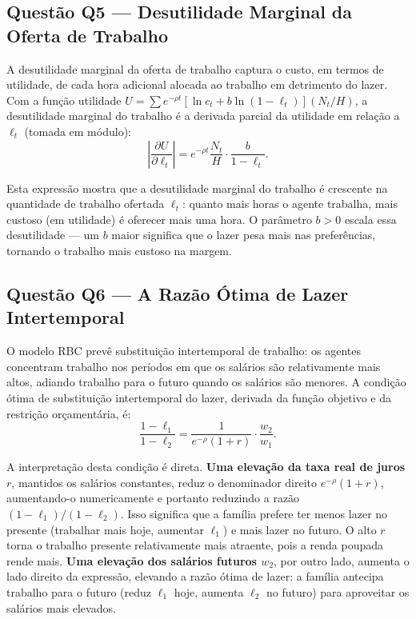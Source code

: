 \documentclass[12pt, a4paper]{article}
\begin{document}
\subsection{Questão Q5 --- Desutilidade Marginal da Oferta de Trabalho}

A desutilidade marginal da oferta de trabalho captura o custo, em termos de utilidade, de cada hora adicional alocada ao trabalho em detrimento do lazer. Com a função utilidade $U = \sum e^{-\rho t}[\ln c_t + b\ln(1-\ell_t)](N_t/H)$, a desutilidade marginal do trabalho é a derivada parcial da utilidade em relação a $\ell_t$ (tomada em módulo):
\[
\left|\frac{\partial U}{\partial \ell_t}\right| = e^{-\rho t}\frac{N_t}{H} \cdot \frac{b}{1-\ell_t}.
\]

Esta expressão mostra que a desutilidade marginal do trabalho é crescente na quantidade de trabalho ofertada $\ell_t$: quanto mais horas o agente trabalha, mais custoso (em utilidade) é oferecer mais uma hora. O parâmetro $b > 0$ escala essa desutilidade — um $b$ maior significa que o lazer pesa mais nas preferências, tornando o trabalho mais custoso na margem.

\subsection{Questão Q6 --- A Razão Ótima de Lazer Intertemporal}

O modelo RBC prevê substituição intertemporal de trabalho: os agentes concentram trabalho nos períodos em que os salários são relativamente mais altos, adiando trabalho para o futuro quando os salários são menores. A condição ótima de substituição intertemporal do lazer, derivada da função objetivo e da restrição orçamentária, é:
\[
\frac{1-\ell_1}{1-\ell_2} = \frac{1}{e^{-\rho}(1+r)}\cdot\frac{w_2}{w_1}.
\]

A interpretação desta condição é direta. \textbf{Uma elevação da taxa real de juros $r$}, mantidos os salários constantes, reduz o denominador direito $e^{-\rho}(1+r)$, aumentando-o numericamente e portanto reduzindo a razão $(1-\ell_1)/(1-\ell_2)$. Isso significa que a família prefere ter menos lazer no presente (trabalhar mais hoje, aumentar $\ell_1$) e mais lazer no futuro. O alto $r$ torna o trabalho presente relativamente mais atraente, pois a renda poupada rende mais. \textbf{Uma elevação dos salários futuros $w_2$}, por outro lado, aumenta o lado direito da expressão, elevando a razão ótima de lazer: a família antecipa trabalho para o futuro (reduz $\ell_1$ hoje, aumenta $\ell_2$ no futuro) para aproveitar os salários mais elevados.
\end{document}
